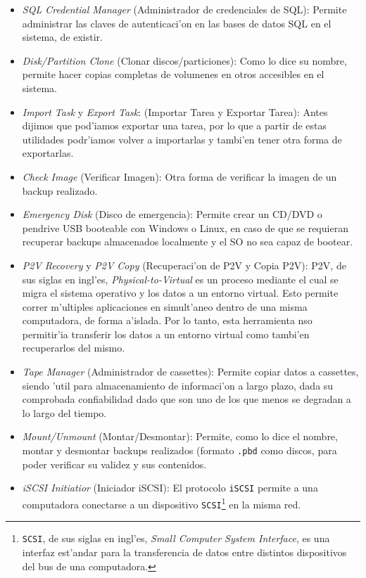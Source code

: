 \documentclass[11pt]{article}
\begin{document}
	\begin{itemize}
		\item \textit{SQL Credential Manager} (Administrador de credenciales de SQL): Permite administrar las claves de autenticaci'on en las bases de datos SQL en el sistema, de existir.
		\item \textit{Disk/Partition Clone} (Clonar discos/particiones): Como lo dice su nombre, permite hacer copias completas de volumenes en otros accesibles en el sistema.
		\item \textit{Import Task} y \textit{Export Task}: (Importar Tarea y Exportar Tarea): Antes dijimos que pod'iamos exportar una tarea, por lo que a partir de estas utilidades podr'iamos volver a importarlas y tambi'en tener otra forma de exportarlas.
		\item \textit{Check Image} (Verificar Imagen): Otra forma de verificar la imagen de un backup realizado.
		\item \textit{Emergency Disk} (Disco de emergencia): Permite crear un CD/DVD o pendrive USB booteable con Windows o Linux, en caso de que se requieran recuperar backups almacenados localmente y el SO no sea capaz de bootear.
		\item \textit{P2V Recovery} y \textit{P2V Copy} (Recuperaci'on de P2V y Copia P2V): P2V, de sus siglas en ingl'es, \textit{Physical-to-Virtual} es un proceso mediante el cual se migra el sistema operativo y los datos a un entorno virtual. Esto permite correr m'ultiples aplicaciones en simult'aneo dentro de una misma computadora, de forma a'islada. Por lo tanto, esta herramienta nso permitir'ia transferir los datos a un entorno virtual como tambi'en recuperarlos del mismo.
		\item \textit{Tape Manager} (Administrador de cassettes): Permite copiar datos a cassettes, siendo 'util para almacenamiento de informaci'on a largo plazo, dada su comprobada confiabilidad dado que son uno de los que menos se degradan a lo largo del tiempo.
		\item \textit{Mount/Unmount} (Montar/Desmontar): Permite, como lo dice el nombre, montar y desmontar backups realizados (formato \texttt{.pbd} como discos, para poder verificar su validez y sus contenidos.
		\item \textit{iSCSI Initiatior} (Iniciador iSCSI): El protocolo \texttt{iSCSI} permite a una computadora conectarse a un dispositivo \texttt{SCSI}\footnote{\texttt{SCSI}, de sus siglas en ingl'es, \textit{Small Computer System Interface}, es una interfaz est'andar para la transferencia de datos entre distintos dispositivos del bus de una computadora.} en la misma red.

\end{itemize}
\end{document}
